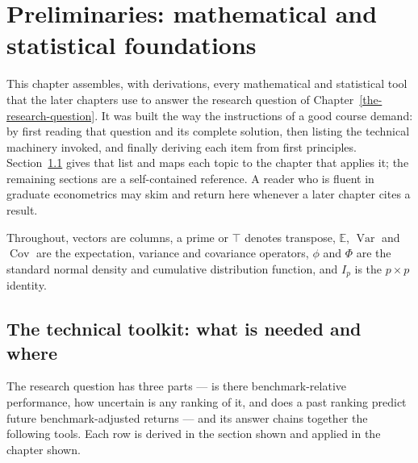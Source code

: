 \hypertarget{preliminaries}{}
\chapter{Preliminaries: mathematical and statistical foundations}\label{preliminaries}

This chapter assembles, with derivations, every mathematical and
statistical tool that the later chapters use to answer the research
question of Chapter~\ref{the-research-question}. It was built the way the
instructions of a good course demand: by first reading that question and
its complete solution, then listing the technical machinery invoked, and
finally deriving each item from first principles. Section~\ref{prelim-toolkit}
gives that list and maps each topic to the chapter that applies it; the
remaining sections are a self-contained reference. A reader who is fluent
in graduate econometrics may skim and return here whenever a later
chapter cites a result.

Throughout, vectors are columns, a prime or $\top$ denotes transpose,
$\mathbb{E}$, $\operatorname{Var}$ and $\operatorname{Cov}$ are the
expectation, variance and covariance operators, $\phi$ and $\Phi$ are the
standard normal density and cumulative distribution function, and
$I_p$ is the $p\times p$ identity.

\section{The technical toolkit: what is needed and where}\label{prelim-toolkit}

The research question has three parts --- is there benchmark-relative
performance, how uncertain is any ranking of it, and does a past ranking
predict future benchmark-adjusted returns --- and its answer chains
together the following tools. Each row is derived in the section shown and
applied in the chapter shown.

